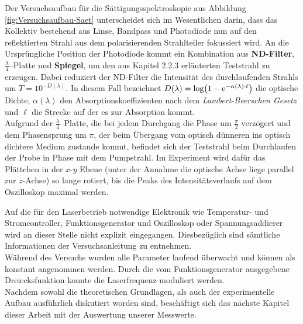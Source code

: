 \noindent Der Versuchsaufbau für die Sättigungsspektroskopie aus Abbildung \ref{fig:Versuchsaufbau-Saet} unterscheidet sich im Wesentlichen darin, dass das Kollektiv bestehend aus Linse, Bandpass und Photodiode nun auf den reflektierten Strahl aus dem polarisierenden Strahlteiler fokussiert wird. An die Ursprüngliche Position der Photodiode kommt ein Kombination aus \textbf{ND-Filter}, \textbf{$\frac{\lambda}{4}$}--Platte und \textbf{Spiegel}, um den aus Kapitel 2.2.3 erläuterten Teststrahl zu erzeugen. Dabei reduziert der ND-Filter die Intensität des durchlaufenden Strahls um $T=10^{-D(\lambda)}$. In diesem Fall bezeichnet $D(\lambda)=\log(1-\mathrm{e}^{-\alpha(\lambda) \cdot \ell})$ die optische Dichte, $\alpha(\lambda)$ den Absorptionskoeffizienten nach dem \textit{Lambert-Beerschen Gesetz} und $\ell$ die Strecke auf der es zur Absorption kommt. \\
\noindent Aufgrund der $\frac{\lambda}{4}$--Platte, die bei jedem Durchgang die Phase um $\frac{\pi}{2}$ verzögert und dem Phasensprung um $\pi$, der beim Übergang vom optisch dünneren ins optisch dichtere Medium zustande kommt, befindet sich der Teststrahl beim Durchlaufen der Probe in Phase mit dem Pumpstrahl. Im Experiment wird dafür das Plättchen in der $x$-$y$ Ebene (unter der Annahme die optische Achse liege parallel zur $z$-Achse) so lange rotiert, bis die Peaks des Intensitätsverlaufs auf dem Oszilloskop maximal werden.

\noindent Auf die für den Laserbetrieb notwendige Elektronik wie Temperatur- und Stromcontroller, Funktionsgenerator und Oszilloskop oder Spannungsaddierer wird an dieser Stelle nicht explizit eingegangen. Diesbezüglich sind sämtliche Informationen der Versuchsanleitung \cite{H2} zu entnehmen. \\
\noindent Während des Versuchs wurden alle Parameter laufend überwacht und können als konstant angenommen werden. Durch die vom Funktionsgenerator ausgegebene Dreiecksfunktion konnte die Laserfrequenz moduliert werden.\\

\noindent Nachdem sowohl die theoretischen Grundlagen, als auch der experimentelle Aufbau ausführlich diskutiert worden sind, beschäftigt sich das nächste Kapitel dieser Arbeit mit der Auswertung unserer Messwerte.

\cleardoublepage{}